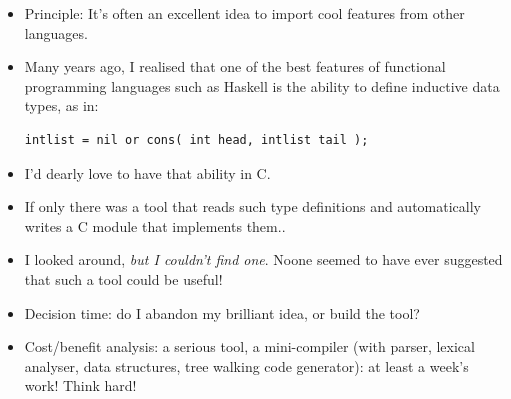 \documentclass[handout,]{beamer}
\newcommand{\pitem}{\pause \item}
\begin{document}
\begin{frame}[fragile]
    \begin{itemize}
    \item
      \alert{Principle:}
      It's often an excellent idea to
      \alert{import cool features from other languages}.
    \pitem
      Many years ago, I realised that one of the best
      features of \alert{functional programming languages}
      such as Haskell is the ability to define
      \alert{inductive data types}, as in:
\begin{verbatim}
intlist = nil or cons( int head, intlist tail );
\end{verbatim}
    \pitem
      I'd dearly love to have that ability in C.

    \pitem
      If only there
      was a tool that \alert{reads such type definitions} and automatically
      writes a \alert{C module that implements them}..
    \pitem
      I looked around, {\em but I couldn't find one}.
      Noone seemed to have ever suggested that such a tool could
      be useful!
    \pitem
      Decision time: do I abandon my brilliant idea, or \alert{build the tool}?
    \pitem
      Cost/benefit analysis: a serious tool, a mini-compiler (with parser, lexical analyser,
      data structures, tree walking code generator):
      at least a week's work!  Think hard!
    \end{itemize}
\end{frame}
\end{document}
